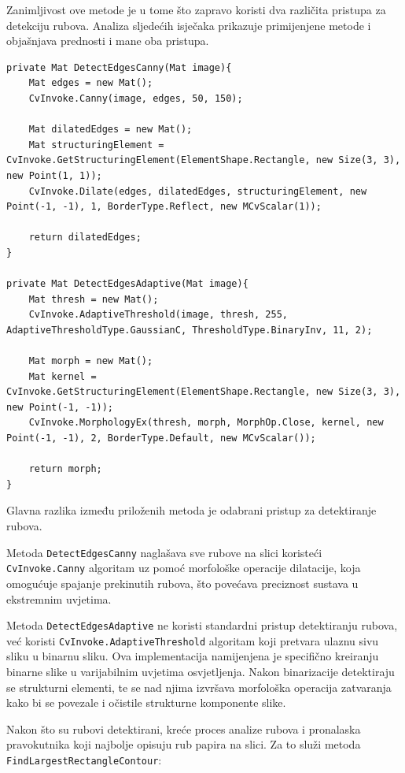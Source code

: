 \documentclass{foi}
\begin{document}
Zanimljivost ove metode je u tome što zapravo koristi dva različita pristupa za detekciju rubova. Analiza sljedećih isječaka prikazuje primijenjene metode i objašnjava prednosti i mane oba pristupa.

\pagebreak
\begin{lstlisting}[caption={Metoda za detekciju rubova tuijekom ispravka perspektive}]
private Mat DetectEdgesCanny(Mat image){
    Mat edges = new Mat();
    CvInvoke.Canny(image, edges, 50, 150);

    Mat dilatedEdges = new Mat();
    Mat structuringElement = CvInvoke.GetStructuringElement(ElementShape.Rectangle, new Size(3, 3), new Point(1, 1));
    CvInvoke.Dilate(edges, dilatedEdges, structuringElement, new Point(-1, -1), 1, BorderType.Reflect, new MCvScalar(1));

    return dilatedEdges;
}

private Mat DetectEdgesAdaptive(Mat image){
    Mat thresh = new Mat();
    CvInvoke.AdaptiveThreshold(image, thresh, 255, AdaptiveThresholdType.GaussianC, ThresholdType.BinaryInv, 11, 2);

    Mat morph = new Mat();
    Mat kernel = CvInvoke.GetStructuringElement(ElementShape.Rectangle, new Size(3, 3), new Point(-1, -1));
    CvInvoke.MorphologyEx(thresh, morph, MorphOp.Close, kernel, new Point(-1, -1), 2, BorderType.Default, new MCvScalar());

    return morph;
}
\end{lstlisting}

Glavna razlika između priloženih metoda je odabrani pristup za detektiranje rubova.

Metoda \texttt{DetectEdgesCanny} naglašava sve rubove na slici koristeći \texttt{CvInvoke.Canny} algoritam uz pomoć morfološke operacije dilatacije, koja omogućuje spajanje prekinutih rubova, što povećava preciznost sustava u ekstremnim uvjetima.

Metoda \texttt{DetectEdgesAdaptive} ne koristi standardni pristup detektiranju rubova, već koristi \texttt{CvInvoke.AdaptiveThreshold} algoritam koji pretvara ulaznu sivu sliku u binarnu sliku. Ova implementacija namijenjena je specifično kreiranju binarne slike u varijabilnim uvjetima osvjetljenja. Nakon binarizacije detektiraju se strukturni elementi, te se nad njima izvršava morfološka operacija zatvaranja kako bi se povezale i očistile strukturne komponente slike.


Nakon što su rubovi detektirani, kreće proces analize rubova i pronalaska pravokutnika koji najbolje opisuju rub papira na slici. Za to služi metoda \texttt{FindLargestRectangleContour}:
\end{document}
